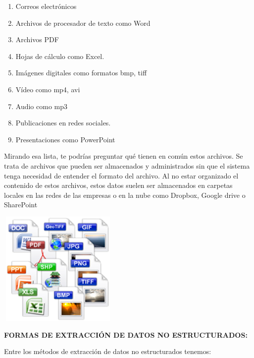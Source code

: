 \documentclass{article} %
\begin{document}
\begin{enumerate}
\item  Correos electr\'{o}nicos

\item  Archivos de procesador de texto como Word

\item  Archivos PDF

\item  Hojas de c\'{a}lculo como Excel.

\item  Im\'{a}genes digitales como formatos bmp, tiff

\item  V\'{i}deo como mp4, avi

\item  Audio como mp3

\item  Publicaciones en redes sociales.

\item  Presentaciones como PowerPoint
\end{enumerate}

\noindent Mirando esa lista, te podr\'{i}as preguntar qu\'{e} tienen en com\'{u}n estos archivos. Se trata de archivos que pueden ser almacenados y administrados sin que el sistema tenga necesidad de entender el formato del archivo. Al no estar organizado el contenido de estos archivos, estos datos suelen ser almacenados en carpetas locales en las redes de las empresas o en la nube como Dropbox, Google drive o SharePoint

\noindent 

\noindent \includegraphics*[width=2.27in, height=2.19in, keepaspectratio=false]{image5}

\noindent \textbf{FORMAS DE EXTRACCI\'{O}N DE DATOS NO ESTRUCTURADOS:}

\noindent Entre los m\'{e}todos de extracci\'{o}n de datos no estructurados tenemos:
\end{document}
